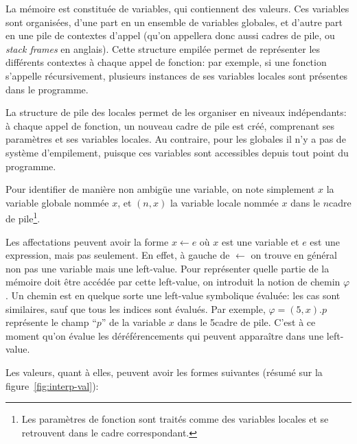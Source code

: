 La mémoire est constituée de variables, qui contiennent des valeurs. Ces
variables sont organisées, d'une part en un ensemble de variables globales, et
d'autre part en une pile de contextes d'appel (qu'on appellera donc
aussi cadres de pile, ou \emph{stack frames} en anglais). Cette structure
empilée permet de représenter les différents contextes à chaque appel de
fonction: par exemple, si une fonction s'appelle récursivement, plusieurs
instances de ses variables locales sont présentes dans le programme.

La structure de pile des locales permet de les organiser en niveaux
indépendants: à chaque appel de fonction, un nouveau cadre de pile est créé,
comprenant ses paramètres et ses variables locales. Au contraire, pour les
globales il n'y a pas de système d'empilement, puisque ces variables sont
accessibles depuis tout point du programme.

Pour identifier de manière non ambigüe une variable, on note simplement $x$ la
variable globale nommée $x$, et $(n, x)$ la variable locale nommée $x$ dans le
$n$\ieme cadre de pile\footnote{Les paramètres de fonction sont traités comme
des variables locales et se retrouvent dans le cadre correspondant.}.

Les affectations peuvent avoir la forme $x ← e$ où $x$ est une variable et $e$
est une expression, mais pas seulement. En effet, à gauche de $←$ on trouve en
général non pas une variable mais une left-value. Pour représenter quelle partie
de la mémoire doit être accédée par cette left-value, on introduit la notion de
chemin $φ$. Un chemin est en quelque sorte une left-value symbolique évaluée:
les cas sont similaires, sauf que tous les indices sont évalués. Par exemple, $φ
= (5, x).p$ représente le champ ``$p$'' de la variable $x$ dans le 5\ieme cadre
de pile. C'est à ce moment qu'on évalue les déréférencements qui peuvent
apparaître dans une left-value.

Les valeurs, quant à elles, peuvent avoir les formes suivantes (résumé sur la
figure~\ref{fig:interp-val}):

